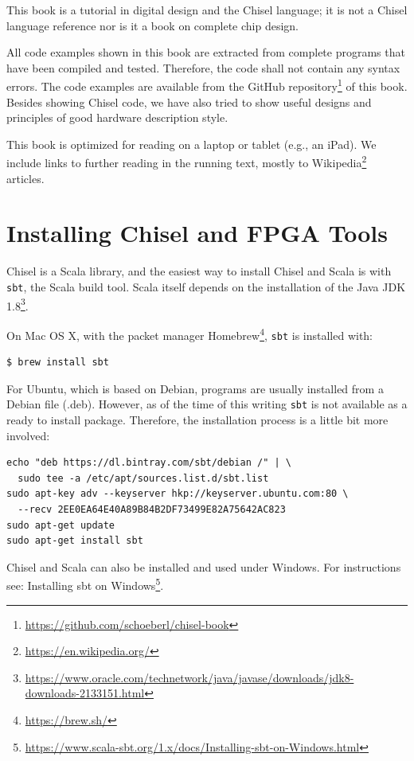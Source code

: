\documentclass[%
    10pt,
    headinclude, footexclude,
    openright, %
    notitlepage,
    cleardoubleempty,
    headsepline,
    pointlessnumbers,
    bibtotoc, idxtotoc,
    ]{scrbook}
\newcommand{\code}[1]{{\small{\texttt{#1}}}}
\newcommand{\myref}[2]{\href{#1}{#2}}
\renewcommand{\myref}[2]{{#2}{\footnote{\url{#1}}}}
\begin{document}
This book is a tutorial in digital design and the Chisel language; it is not
a Chisel language reference nor is it a book on complete chip design.


All code examples shown in this book are extracted from complete programs
that have been compiled and tested. Therefore, the code shall not contain
any syntax errors. The code examples are available from the
\myref{https://github.com/schoeberl/chisel-book}{GitHub repository}
of this book.
Besides showing Chisel code, we have also tried to show useful designs and
principles of good hardware description style.

This book is optimized for reading on a laptop or tablet (e.g., an iPad).
We include links to further reading in the running text, mostly to
\myref{https://en.wikipedia.org/}{Wikipedia} articles.

\section{Installing Chisel and FPGA Tools}

Chisel is a Scala library, and the easiest way to install Chisel and Scala is
with \code{sbt}, the Scala build tool. Scala itself depends on the installation
of the \myref{https://www.oracle.com/technetwork/java/javase/downloads/jdk8-downloads-2133151.html}{Java JDK 1.8}.

On Mac OS X, with the packet manager \myref{https://brew.sh/}{Homebrew},
\code{sbt} is installed with:

\begin{verbatim}
$ brew install sbt
\end{verbatim}

\noindent For Ubuntu, which is based on Debian, programs are usually installed from a
Debian file (.deb). However, as of the time of this writing \code{sbt} is not
available as a ready to install package. Therefore, the installation process
is a little bit more involved:
\begin{verbatim}
echo "deb https://dl.bintray.com/sbt/debian /" | \
  sudo tee -a /etc/apt/sources.list.d/sbt.list
sudo apt-key adv --keyserver hkp://keyserver.ubuntu.com:80 \
  --recv 2EE0EA64E40A89B84B2DF73499E82A75642AC823
sudo apt-get update
sudo apt-get install sbt
\end{verbatim}



Chisel and Scala can also be installed and used under Windows.
For instructions see:
\myref{https://www.scala-sbt.org/1.x/docs/Installing-sbt-on-Windows.html}{Installing sbt on Windows}.
\end{document}

